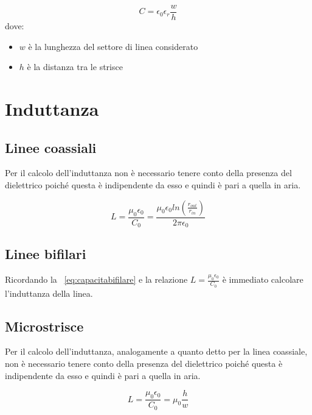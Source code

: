 \documentclass[10pt,a4paper]{report}
\begin{document}
	 		\begin{equation}
			C=\epsilon_0 \epsilon_r\frac{w}{h}	 			
	 		\end{equation} 
	 		dove:
	 		\begin{itemize}
	 		\item $w$ è la lunghezza del settore di linea considerato
	 		\item $h$ è la distanza tra le strisce
	 		\end{itemize}


	\section{Induttanza}

		\subsection{Linee coassiali}

			Per il calcolo dell’induttanza non è necessario tenere conto della presenza del dielettrico
			poiché questa è indipendente da esso e quindi è pari a quella in aria.
		
			\begin{equation}
				L=\frac{\mu_0 \epsilon_0}{C_0}=\frac{\mu_0 \epsilon_0 ln (\frac { r_{out}} {r_{in} } )}{2\pi \epsilon_0}
			\end{equation}



		\subsection{Linee bifilari}

		Ricordando la ~\ref{eq:capacitabifilare} e la relazione $L=\frac{\mu_0 \epsilon_0}{C_0}$ è immediato calcolare l'induttanza della linea.

		\subsection{Microstrisce}
			
			Per il calcolo dell’induttanza, analogamente a quanto detto per la linea coassiale, non è necessario tenere conto della presenza del dielettrico
			poiché questa è indipendente da esso e quindi è pari a quella in aria.
		
			\begin{equation}
				L=\frac{\mu_0 \epsilon_0}{C_0}=\mu_0 \frac{h}{w}
			\end{equation}
	
\end{document}
